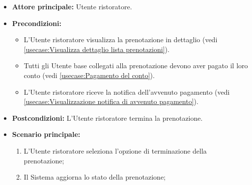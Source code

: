 \label{usecase:Termina prenotazione}
\begin{itemize}
	\item \textbf{Attore principale:} Utente ristoratore.

	\item \textbf{Precondizioni:}
	      \begin{itemize}
		      \item L'Utente ristoratore visualizza la prenotazione in dettaglio (vedi \autoref{usecase:Visualizza dettaglio lista prenotazioni}).
		      \item Tutti gli Utente base collegati alla prenotazione devono aver pagato il loro conto (vedi \autoref{usecase:Pagamento del conto}).
		      \item L'Utente ristoratore riceve la notifica dell'avvenuto pagamento (vedi \autoref{usecase:Visualizzazione notifica di avvenuto pagamento}).
	      \end{itemize}

	\item \textbf{Postcondizioni:} L'Utente ristoratore termina la prenotazione.


	\item \textbf{Scenario principale:}
	      \begin{enumerate}
		      \item L'Utente ristoratore seleziona l'opzione di terminazione della prenotazione;

		      \item Il Sistema aggiorna lo stato della prenotazione;
	      \end{enumerate}
\end{itemize}
